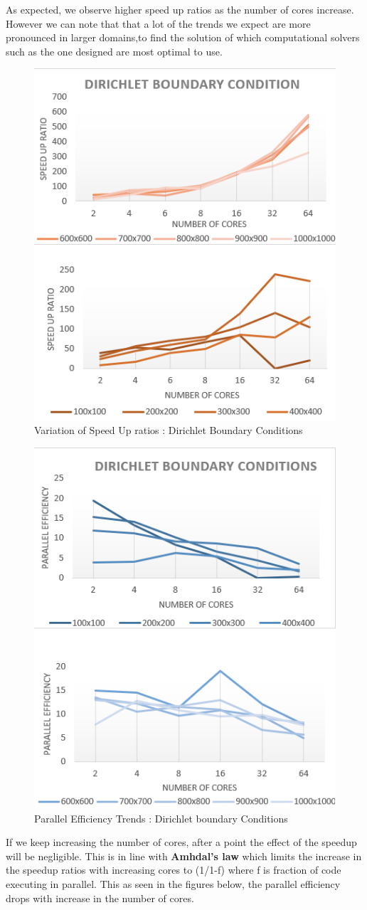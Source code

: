 \documentclass[twoside,twocolumn]{article}
\begin{document}
As expected, we observe higher speed up ratios as the number of cores increase. However we can note that that a lot of the trends we expect are more pronounced in larger domains,to find the solution of which computational solvers such as the one designed are most optimal to use. 

\vspace{-4mm}
\begin{figure}[H]
\centering
\includegraphics[height=10.5 cm\textwidth]{images/speedupratios - dirichlet.png}
\caption{Variation of Speed Up ratios : Dirichlet Boundary Conditions}
\end{figure}

\begin{figure}[H]
\centering
\includegraphics[height=10.5 cm\textwidth]{images/PARALLEL EFFICIENCY DIRICHELT.png}
\caption{Parallel Efficiency Trends : Dirichlet boundary Conditions}
\end{figure}
If we keep increasing the number of cores, after a point the effect of the speedup will be negligible. This is in line with \textbf{Amhdal's law} which limits the increase in the speedup ratios with increasing cores to (1/1-f) where f is fraction of code executing in parallel. This as seen in the figures below, the parallel efficiency drops with increase in the number of cores.
\end{document}
